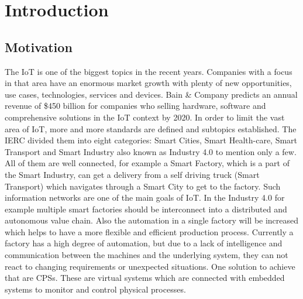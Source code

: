 \chapter{Introduction}
\minitoc\vspace{.5cm}

\section{Motivation}

The \ac{IoT} is one of the biggest topics in the recent years.
Companies with a focus in that area have an enormous market growth with plenty of new opportunities, use cases, technologies, services and devices.
Bain \& Company predicts an annual revenue of \$450 billion for companies who selling hardware, software and comprehensive solutions in the \ac{IoT} context by 2020.\autocite{Bosche:2016}
In order to limit the vast area of \ac{IoT}, more and more standards are defined and subtopics established.
The \ac{IERC} divided them into eight categories: Smart Cities, Smart Health-care, Smart Transport and Smart Industry also known as Industry 4.0 to mention only a few.\autocite[cf.][p. 7]{IERC:2011}
All of them are well connected, for example a Smart Factory, which is a part of the Smart Industry, can get a delivery from a self driving truck (Smart Transport) which navigates through a Smart City to get to the factory.
Such information networks are one of the main goals of \ac{IoT}.
In the Industry 4.0 for example multiple smart factories should be interconnect into a distributed and autonomous value chain.
Also the automation in a single factory will be increased which helps to have a more flexible and efficient production process.
Currently a factory has a high degree of automation, but due to a lack of intelligence and communication between the machines and the underlying system, they can not react to changing requirements or unexpected situations.
One solution to achieve that are \acp{CPS}.
These are virtual systems which are connected with embedded systems to monitor and control physical processes.\autocite[cf.][p. 363]{Lee:2008}
